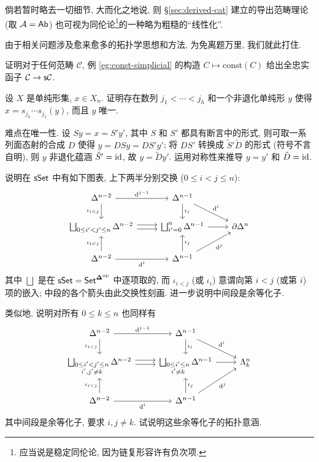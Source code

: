 倘若暂时略去一切细节, 大而化之地说, 则 \S\ref{sec:derived-cat} 建立的导出范畴理论 (取 $\mathcal{A} = \mathsf{Ab}$) 也可视为同伦论\footnote{应当说是稳定同伦论, 因为链复形容许有负次项.}的一种略为粗糙的``线性化''.

由于相关问题涉及愈来愈多的拓扑学思想和方法, 为免离题万里, 我们就此打住.

\begin{Exercises}
	\item 证明对于任何范畴 $\mathcal{C}$, 例 \ref{eg:const-simplicial} 的构造 $C \mapsto \mathrm{const}(C)$ 给出全忠实函子 $\mathcal{C} \to \mathsf{s}\mathcal{C}$.
	
	\item 设 $X$ 是单纯形集, $x \in X_n$. 证明存在数列 $j_1 < \cdots < j_h$ 和一个非退化单纯形 $y$ 使得 $x = s_{j_h} \cdots s_{j_1} (y)$, 而且 $y$ 唯一.
	
	\begin{hint}
		难点在唯一性. 设 $Sy = x = S' y'$, 其中 $S$ 和 $S'$ 都具有断言中的形式, 则可取一系列面态射的合成 $D$ 使得 $y = DS y = DS' y'$; 将 $DS'$ 转换成 $\tilde{S}'\tilde{D}$ 的形式 (符号不言自明), 则 $y$ 非退化蕴涵 $\tilde{S}' = \mathrm{id}$, 故 $y = \tilde{D}y'$. 运用对称性来推导 $y = y'$ 和 $\tilde{D} = \mathrm{id}$.
	\end{hint}
	
	\item 说明在 $\mathsf{sSet}$ 中有如下图表, 上下两半分别交换 ($0 \leq i < j \leq n$):
	\[\begin{tikzcd}
		\Delta^{n-2} \arrow[d, "{\iota_{i < j}}"'] \arrow[r, "{\mathrm{d}^{j-1}}"] & \Delta^{n-1} \arrow[d, "\iota_i"] \arrow[rd, "{\mathrm{d}^i}"] & \\
		\bigsqcup_{0 \leq i' < j' \leq n} \Delta^{n-2} \arrow[shift left, r] \arrow[shift right, r] & \bigsqcup_{i' = 0}^n \Delta^{n-1} \arrow[r] & \partial \Delta^n \\
		\Delta^{n-2} \arrow[u, "{\iota_{i < j}}"] \arrow[r, "{\mathrm{d}^i}"'] & \Delta^{n-1} \arrow[u, "\iota_j"'] \arrow[ru, "{\mathrm{d}^j}"'] &
	\end{tikzcd}\]
	其中 $\bigsqcup$ 是在 $\mathsf{sSet} = \mathsf{Set}^{\bm\Delta^{\operatorname{op}}}$ 中逐项取的, 而 $\iota_{i < j}$ (或 $\iota_i$) 意谓向第 $i < j$ (或第 $i$) 项的嵌入; 中段的各个箭头由此交换性刻画. 进一步说明中间段是余等化子.
	
	类似地, 说明对所有 $0 \leq k \leq n$ 也同样有
	\[\begin{tikzcd}
		\Delta^{n-2} \arrow[d, "{\iota_{i < j}}"'] \arrow[r, "{\mathrm{d}^{j-1}}"] & \Delta^{n-1} \arrow[d, "\iota_i"] \arrow[rd, "{\mathrm{d}^i}"] & \\
		\bigsqcup_{\substack{0 \leq i' < j' \leq n \\ i', j' \neq k}} \Delta^{n-2} \arrow[shift left, r] \arrow[shift right, r] & \bigsqcup_{\substack{0 \leq i' \leq n \\ i' \neq k}} \Delta^{n-1} \arrow[r] & \Lambda^n_k \\
		\Delta^{n-2} \arrow[u, "{\iota_{i < j}}"] \arrow[r, "{\mathrm{d}^i}"'] & \Delta^{n-1} \arrow[u, "\iota_j"'] \arrow[ru, "{\mathrm{d}^j}"'] &
	\end{tikzcd}\]
	其中间段是余等化子, 要求 $i, j \neq k$. 试说明这些余等化子的拓扑意涵.
	

\end{Exercises}
